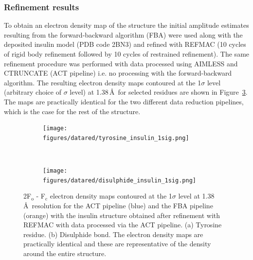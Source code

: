 \subsubsection{Refinement results}
\label{subs:Refinement results - insulin}
To obtain an electron density map of the structure the initial amplitude estimates resulting from the forward-backward algorithm (FBA) were used along with the deposited insulin model (PDB code 2BN3) and refined with REFMAC \cite{murshudov2011refmac5} (10 cycles of rigid body refinement followed by 10 cycles of restrained refinement).
The same refinement procedure was performed with data processed using AIMLESS \cite{evans2013} and CTRUNCATE (ACT pipeline) \cite{winn2011} i.e. no processing with the forward-backward algorithm.
The resulting electron density maps contoured at the 1$\sigma$ level (arbitrary choice of $\sigma$ level) at 1.38$\,$\AA\ for selected residues are shown in Figure~\ref{fig:Electron density maps - insulin}.
The maps are practically identical for the two different data reduction pipelines, which is the case for the rest of the structure.
\begin{figure}
	\centering
    \begin{subfigure}[b]{1.0\textwidth}
        \centering
        \texttt{[image: figures/datared/tyrosine\_insulin\_1sig.png]}
        \caption{}
        \label{fig:Tyrosine residue - insulin}
    \end{subfigure}
    \\
	\begin{subfigure}[b]{1.0\textwidth}
        \centering
        \texttt{[image: figures/datared/disulphide\_insulin\_1sig.png]}
        \caption{}
        \label{fig:Disulpide bond - insulin}
    \end{subfigure}
    \caption[2F$_{\text{o}}$ - F$_{\text{c}}$ electron density maps for insulin dataset.]{2F$_{\text{o}}$ - F$_{\text{c}}$ electron density maps contoured at the 1$\sigma$ level at 1.38$\,$\AA\ resolution for the ACT pipeline (blue) and the FBA pipeline (orange) with the insulin structure obtained after refinement with REFMAC with data processed via the ACT pipeline.
    (a) Tyrosine residue.
    (b) Disulphide bond.
    The electron density maps are practically identical and these are representative of the density around the entire structure.}
    \label{fig:Electron density maps - insulin}
\end{figure}

